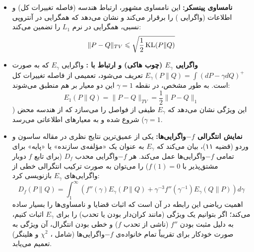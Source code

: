 \begin{itemize}
    \item \textbf{نامساوی پینسکر:}
    این نامساوی مشهور، ارتباط هندسه (فاصله تغییرات کل) و اطلاعات (واگرایی ) را برقرار می‌کند و نشان می‌دهد که همگرایی در آنتروپی نسبی، همگرایی در نرم $L_1$ را تضمین می‌کند:
    \begin{equation}
    \label{eq:pinsker}
    \| P - Q \|_{TV} \leqslant \sqrt{\frac{1}{2} \operatorname*{KL}(P \| Q)}
    \end{equation}
    
    \item \textbf{واگرایی $E_\gamma$ (چوب هاکی) و ارتباط با :}
    واگرایی $E_\gamma$ که به صورت $E_\gamma(P\|Q) = \int (dP - \gamma dQ)^+$ تعریف می‌شود، تعمیمی از فاصله تغییرات کل است. به طور مشخص، در نقطه $\gamma=1$ این دو معیار بر هم منطبق می‌شوند:
    \begin{equation}
    E_1(P \| Q) = \| P - Q \|_{TV} = \frac{1}{2} \| P - Q \|_1
    \end{equation}
    این ویژگی نشان می‌دهد که $E_\gamma$ طیفی از فواصل را می‌سازد که از هندسه محض ($\gamma=1$) شروع شده و به معیارهای اطلاعاتی می‌رسد.

    \item \textbf{نمایش انتگرالی $-f$واگرایی‌ها:}
    یکی از عمیق‌ترین نتایج نظری در مقاله ساسون و وردو \cite{sason2016f} (قضیه ۱۱)، بیان می‌کند که $E_\gamma$ به عنوان یک «مؤلفه‌ی سازنده» یا «پایه» برای تمامی $-f$واگرایی‌ها عمل می‌کند. هر $-f$واگرایی محدب $D_f$ (برای تابع $f$ دوبار مشتق‌پذیر با $f(1)=0$) را می‌توان به صورت ترکیب انتگرالی خطی از واگرایی‌های $E_\gamma$ بازنویسی کرد:
    \begin{equation}
    \label{eq:integral_rep_sason}
    D_f(P \| Q) = \int_{1}^{\infty} \left( f''(\gamma) E_\gamma(P \| Q) + \gamma^{-3} f''(\gamma^{-1}) E_\gamma(Q \| P) \right) d\gamma
    \end{equation}
    اهمیت ریاضی این رابطه در آن است که اثبات قضایا و نامساوی‌ها را بسیار ساده می‌کند؛ اگر بتوانیم یک ویژگی (مانند کران‌دار بودن یا تحدب) را برای $E_\gamma$ اثبات کنیم، به دلیل مثبت بودن $f''$ (ناشی از تحدب $f$) و خطی بودن انتگرال، آن ویژگی به صورت خودکار برای تقریباً تمام خانواده‌ی $-f$واگرایی‌ها (شامل ، $\chi^2$ و هلینگر) تعمیم می‌یابد.
\end{itemize}


